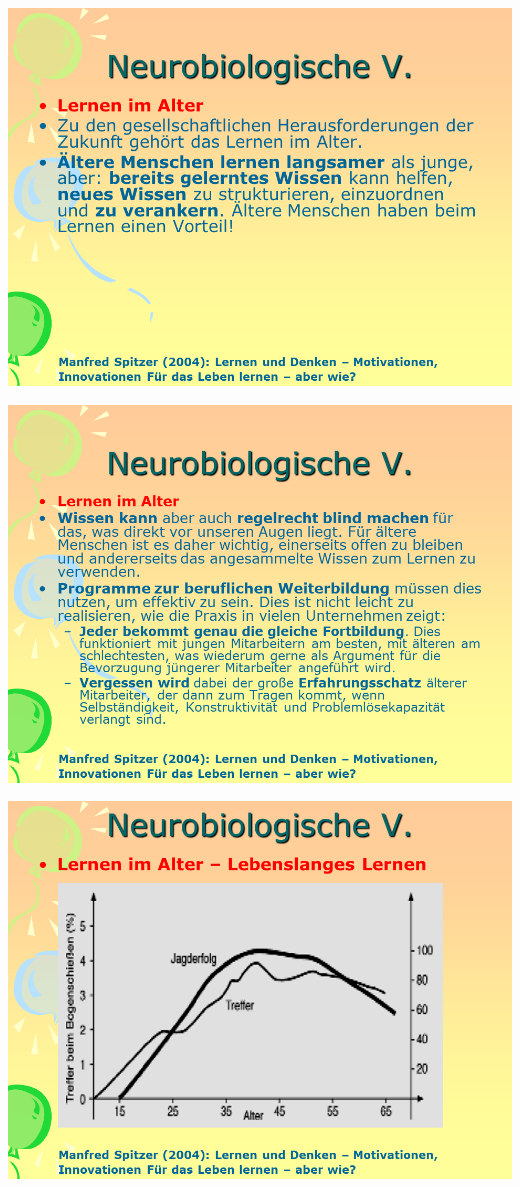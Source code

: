 \documentclass[
  letterpaper,
]{scrbook}
\begin{document}
\includegraphics[width=1\textwidth,height=\textheight]{./pictures/neuro/Diapozitiv73.PNG}

\includegraphics[width=1\textwidth,height=\textheight]{./pictures/neuro/Diapozitiv74.PNG}

\includegraphics[width=1\textwidth,height=\textheight]{./pictures/neuro/Diapozitiv75.PNG}
\end{document}
